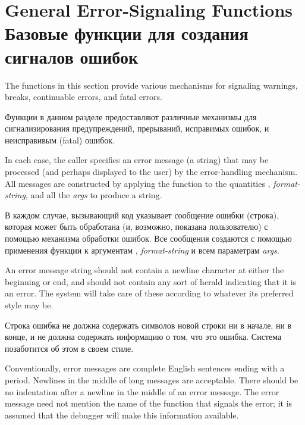 \section{General Error-Signaling Functions Базовые функции для создания сигналов
ошибок}
\label{ERROR-SIGNALLING-FUNCTIONS}

The functions in this section provide various mechanisms
for signaling warnings, breaks, continuable errors, and fatal errors.

Функции в данном разделе предоставляют различные механизмы для сигнализирования
предупреждений, прерываний, исправимых ошибок, и неисправивым (fatal) ошибок.

In each case, the caller specifies an error message (a string) that may be
processed (and perhaps displayed to the user) by the error-handling
mechanism.  All messages are
constructed by applying the function
 to the quantities {\nil}, \emph{format-string},
and all the \emph{args} to produce a string.

В каждом случае, вызывающий код указывает сообщение ошибки (строка), которая
может быть обработана (и, возможно, показана пользователю) с помощью механизма
обработки ошибок. Все сообщения создаются с помощью применения функции
 к аргументам {\nil}, \emph{format-string} и всем параметрам
\emph{args}.

An error message string should not contain a newline character
at either the beginning or end, and should not contain any sort of
herald indicating that it is an error.  The system will take care of
these according to whatever its preferred style may be.  

Строка ошибка не должна содержать символов новой строки ни в начале, ни в конце,
и не должна содержать информацию о том, что это ошибка. Система позаботится об
этом в своем стиле.

Conventionally,
error messages are complete English sentences ending with a period.
Newlines in the middle of long messages are acceptable.  There
should be no indentation after a newline in the middle of an
error message.  The error message need not mention the name of the function
that signals the error; it is assumed that the debugger will make this
information available.

